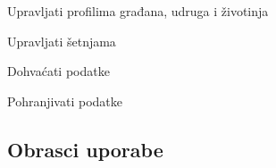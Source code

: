 \begin{packed_enum}
\begin{packed_enum}
				\end{packed_enum}
			
				\item  {}
				
				\begin{packed_enum}
					
					\item Upravljati profilima građana, udruga i životinja
					\item Upravljati šetnjama
					
				\end{packed_enum}
			
				\item {}
				
					\begin{packed_enum}
						
						\item Dohvaćati podatke
						\item Pohranjivati podatke
						
					\end{packed_enum}
					
			
			\end{packed_enum}
			
			\eject 
			
			
				
			\subsection{Obrasci uporabe}
				
	
					
